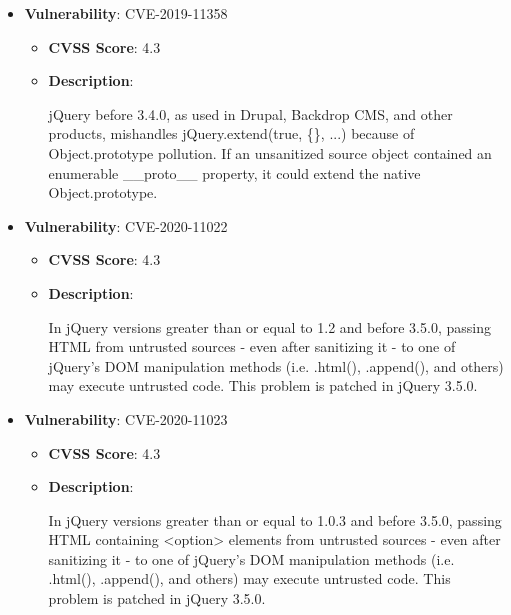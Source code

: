 \documentclass{article}
\begin{document}
\begin{itemize}
        \item \textbf{Vulnerability}: CVE-2019-11358
        \begin{itemize}
            \item \textbf{CVSS Score}:  4.3 
            \item \textbf{Description}:
            \parbox[t]{0.9\linewidth}{
                \ttfamily jQuery before 3.4.0, as used in Drupal, Backdrop CMS, and other products, mishandles jQuery.extend(true, \{\}, ...) because of Object.prototype pollution. If an unsanitized source object contained an enumerable \_\_proto\_\_ property, it could extend the native Object.prototype.
            }
        \end{itemize}
    
        \item \textbf{Vulnerability}: CVE-2020-11022
        \begin{itemize}
            \item \textbf{CVSS Score}:  4.3 
            \item \textbf{Description}:
            \parbox[t]{0.9\linewidth}{
                \ttfamily In jQuery versions greater than or equal to 1.2 and before 3.5.0, passing HTML from untrusted sources - even after sanitizing it - to one of jQuery's DOM manipulation methods (i.e. .html(), .append(), and others) may execute untrusted code. This problem is patched in jQuery 3.5.0.
            }
        \end{itemize}
    
        \item \textbf{Vulnerability}: CVE-2020-11023
        \begin{itemize}
            \item \textbf{CVSS Score}:  4.3 
            \item \textbf{Description}:
            \parbox[t]{0.9\linewidth}{
                \ttfamily In jQuery versions greater than or equal to 1.0.3 and before 3.5.0, passing HTML containing <option> elements from untrusted sources - even after sanitizing it - to one of jQuery's DOM manipulation methods (i.e. .html(), .append(), and others) may execute untrusted code. This problem is patched in jQuery 3.5.0.
            }
        \end{itemize}
    
\end{itemize}




\clearpage
\end{document}
